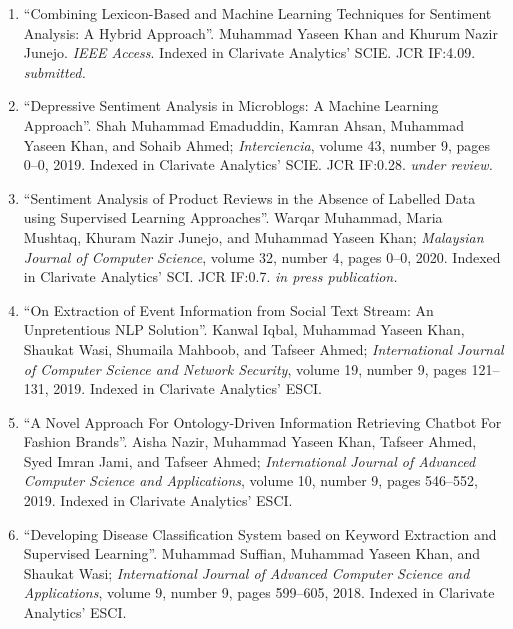 \documentclass[a4paper, 10pt]{article}
\begin{document}
\begin{enumerate}
\itemsep-4pt 
	\item ``Combining Lexicon-Based and Machine Learning Techniques for Sentiment Analysis: A Hybrid Approach''. Muhammad Yaseen Khan and Khurum Nazir Junejo. \emph{IEEE Access}. Indexed in Clarivate Analytics' SCIE. JCR IF:4.09. \emph{\small submitted.}
       
	\item ``Depressive Sentiment Analysis in Microblogs: A Machine Learning Approach''. Shah Muhammad Emaduddin, Kamran Ahsan, Muhammad Yaseen Khan, and Sohaib Ahmed; \emph{Interciencia}, volume 43, number 9, pages 0--0, 2019. Indexed in Clarivate Analytics' SCIE. JCR IF:0.28. \emph{\small under review.}
       
    \item ``Sentiment Analysis of Product Reviews in the Absence of Labelled Data using Supervised Learning Approaches''. Warqar Muhammad, Maria Mushtaq, Khuram Nazir Junejo, and Muhammad Yaseen Khan; \emph{Malaysian Journal of Computer Science}, volume 32, number 4, pages 0--0, 2020. Indexed in Clarivate Analytics' SCI. JCR IF:0.7. \emph{\small in press publication.}
	
	\item ``On Extraction of Event Information from Social Text Stream: An Unpretentious NLP Solution''. Kanwal Iqbal, Muhammad Yaseen Khan, Shaukat Wasi, Shumaila Mahboob, and Tafseer Ahmed; \emph{International Journal of Computer Science and Network Security}, volume 19, number 9, pages 121--131, 2019. Indexed in Clarivate Analytics' ESCI.
 
	\item ``A Novel Approach For Ontology-Driven Information Retrieving Chatbot For Fashion Brands''. Aisha Nazir, Muhammad Yaseen Khan, Tafseer Ahmed, Syed Imran Jami, and Tafseer Ahmed; \emph{International Journal of Advanced Computer Science and Applications}, volume 10, number 9, pages 546--552, 2019. Indexed in Clarivate Analytics' ESCI. 
      
	\item ``Developing Disease Classification System based on Keyword Extraction and Supervised Learning''. Muhammad Suffian, Muhammad Yaseen Khan, and Shaukat Wasi; \emph{International Journal of Advanced Computer Science and Applications}, volume 9, number 9, pages 599--605, 2018. Indexed in Clarivate Analytics' ESCI.
\end{enumerate}
\end{document}
